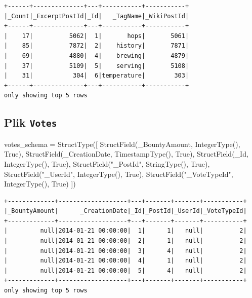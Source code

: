 \documentclass[
  letterpaper,
  DIV=11,
  numbers=noendperiod]{scrreprt}
\newenvironment{Shaded}{\begin{snugshade}}{\end{snugshade}}
\newcommand{\NormalTok}[1]{\textcolor[rgb]{0.00,0.23,0.31}{#1}}
\newcommand{\OperatorTok}[1]{\textcolor[rgb]{0.37,0.37,0.37}{#1}}
\newcommand{\StringTok}[1]{\textcolor[rgb]{0.13,0.47,0.30}{#1}}
\newcommand{\VariableTok}[1]{\textcolor[rgb]{0.07,0.07,0.07}{#1}}
\begin{document}
\begin{verbatim}
+------+--------------+---+-----------+-----------+
|_Count|_ExcerptPostId|_Id|   _TagName|_WikiPostId|
+------+--------------+---+-----------+-----------+
|    17|          5062|  1|       hops|       5061|
|    85|          7872|  2|    history|       7871|
|    69|          4880|  4|    brewing|       4879|
|    37|          5109|  5|    serving|       5108|
|    31|           304|  6|temperature|        303|
+------+--------------+---+-----------+-----------+
only showing top 5 rows
\end{verbatim}

\normalsize

\hypertarget{plik-votes}{%
\subsection{\texorpdfstring{Plik
\texttt{Votes}}{Plik Votes}}\label{plik-votes}}

\small

\begin{Shaded}
\begin{Highlighting}[]
\NormalTok{votes\_schema }\OperatorTok{=}\NormalTok{ StructType([}
\NormalTok{    StructField(}\StringTok{\textquotesingle{}\_BountyAmount\textquotesingle{}}\NormalTok{, IntegerType(), }\VariableTok{True}\NormalTok{),}
\NormalTok{    StructField(}\StringTok{\textquotesingle{}\_CreationDate\textquotesingle{}}\NormalTok{, TimestampType(), }\VariableTok{True}\NormalTok{),}
\NormalTok{    StructField(}\StringTok{\textquotesingle{}\_Id\textquotesingle{}}\NormalTok{, IntegerType(), }\VariableTok{True}\NormalTok{),}
\NormalTok{    StructField(}\StringTok{"\_PostId"}\NormalTok{, StringType(), }\VariableTok{True}\NormalTok{),}
\NormalTok{    StructField(}\StringTok{"\_UserId"}\NormalTok{, IntegerType(), }\VariableTok{True}\NormalTok{),}
\NormalTok{    StructField(}\StringTok{"\_VoteTypeId"}\NormalTok{, IntegerType(), }\VariableTok{True}\NormalTok{)}
\NormalTok{])}
\end{Highlighting}
\end{Shaded}

\begin{verbatim}
+-------------+-------------------+---+-------+-------+-----------+
|_BountyAmount|      _CreationDate|_Id|_PostId|_UserId|_VoteTypeId|
+-------------+-------------------+---+-------+-------+-----------+
|         null|2014-01-21 00:00:00|  1|      1|   null|          2|
|         null|2014-01-21 00:00:00|  2|      1|   null|          2|
|         null|2014-01-21 00:00:00|  3|      4|   null|          2|
|         null|2014-01-21 00:00:00|  4|      1|   null|          2|
|         null|2014-01-21 00:00:00|  5|      4|   null|          2|
+-------------+-------------------+---+-------+-------+-----------+
only showing top 5 rows
\end{verbatim}
\end{document}
